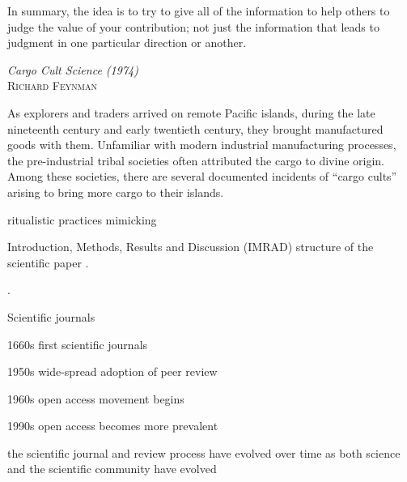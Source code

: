 \documentclass[ChapterTOCs,krantz2]{krantz} %
\begin{document}
\setlength{\epigraphrule}{0pt}
\setlength{\epigraphwidth}{.65\textwidth}
\epigraph%
{%
  In summary, the idea is to try to give all of the information to
  help others to judge the value of your contribution; not just the
  information that leads to judgment in one particular direction or
  another.
}%
{\textit{Cargo Cult Science (1974)}\\ \textsc{Richard Feynman} }


As explorers and traders arrived on remote Pacific islands, during the
late nineteenth century and early twentieth century, they brought manufactured
goods with them.  Unfamiliar with modern industrial manufacturing processes, the
pre-industrial tribal societies often attributed the cargo to divine origin.
Among these societies, there are several documented incidents of ``cargo cults''
arising to bring more cargo to their islands.

ritualistic practices mimicking 

Introduction, Methods, Results and Discussion (IMRAD) structure of the
scientific paper \cite{sollaci2004introduction,spier2002history}.
 
\cite{medawar1963scientific}.


Scientific journals

1660s  first scientific journals

1950s  wide-spread adoption of peer review

1960s  open access movement begins

1990s  open access becomes more prevalent

the scientific journal and review process have evolved over time as both science and the scientific community have evolved
\end{document}
